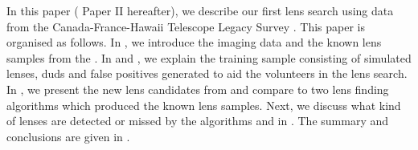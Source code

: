 \documentclass[useAMS,usenatbib,a4paper]{mn2e}
\begin{document}
%
%
%
%
%

In this paper ( Paper II hereafter), we describe our first lens search using
data from the Canada-France-Hawaii Telescope Legacy Survey
\citep[CFHTLS,][]{Gwyn2012}. This
paper is organised as follows. In , we introduce the \cfhtls
imaging data and the known lens samples from the \cfhtls. In  and
, we explain the training sample consisting of simulated lenses,
duds and false positives generated to aid the \sw volunteers in the lens search.
In , we present the new lens candidates from \sw and compare
\sw to two lens finding algorithms which produced the known \cfhtls lens
samples. Next, we discuss what kind of lenses are detected or missed by the
algorithms and \sw in . The summary and conclusions are given
in .
\end{document}

